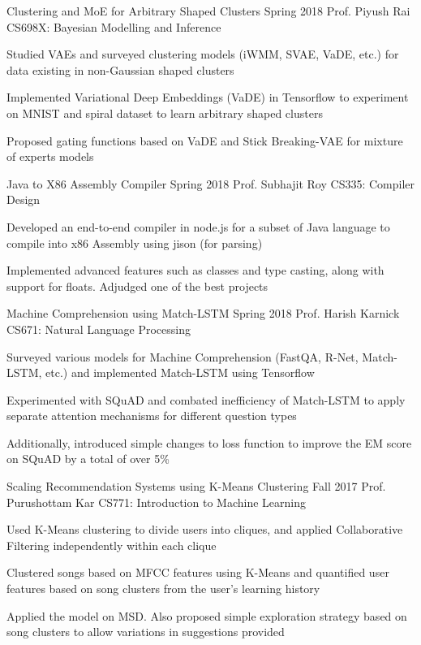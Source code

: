 \begin{cventries}
	\cventry
	{Clustering and MoE for Arbitrary Shaped Clusters}
	{}
	{Spring 2018}
	{Prof. Piyush Rai}
	{CS698X: Bayesian Modelling and Inference}
	{
		\begin{cvitems}
		\item Studied VAEs and surveyed clustering models (iWMM, SVAE, VaDE, etc.) for data existing in non-Gaussian shaped clusters
		\item Implemented Variational Deep Embeddings (VaDE) in Tensorflow to experiment on MNIST and spiral dataset to learn arbitrary shaped clusters
		\item Proposed gating functions based on VaDE and Stick Breaking-VAE for mixture of experts models
		\end{cvitems}
	}

	\cventry
	{Java to X86 Assembly Compiler}
	{}
	{Spring 2018}
	{Prof. Subhajit Roy}
	{CS335: Compiler Design}
	{
		\begin{cvitems}
		\item Developed an end-to-end compiler in node.js for a subset of Java language to compile into x86 Assembly using jison (for parsing)
		\item Implemented advanced features such as classes and type casting, along with support for floats. Adjudged one of the best projects
		\end{cvitems}
	}

	\cventry
	{Machine Comprehension using Match-LSTM}
	{}
	{Spring 2018}
	{Prof. Harish Karnick}
	{CS671: Natural Language Processing}
	{
		\begin{cvitems}
		\item Surveyed various models for Machine Comprehension (FastQA, R-Net, Match-LSTM, etc.) and implemented Match-LSTM using Tensorflow
		\item Experimented with SQuAD and combated inefficiency of Match-LSTM to apply separate attention mechanisms for different question types
		\item Additionally, introduced simple changes to loss function to improve the EM score on SQuAD by a total of over 5\%
		\end{cvitems}
	}

	\cventry
	{Scaling Recommendation Systems using K-Means Clustering}
	{}
	{Fall 2017}
	{Prof. Purushottam Kar}
	{CS771: Introduction to Machine Learning}
	{
		\begin{cvitems}
		\item Used K-Means clustering to divide users into cliques, and applied Collaborative Filtering independently within each clique
		\item Clustered songs based on MFCC features using K-Means and quantified user features based on song clusters from the user’s learning history
		\item Applied the model on MSD. Also proposed simple exploration strategy based on song clusters to allow variations in suggestions provided
		\end{cvitems}
	}


\end{cventries}
